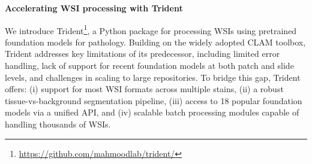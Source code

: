 \noindent\textbf{\large{Accelerating WSI processing with Trident}} \label{sec4}

We introduce Trident\footnote{\url{https://github.com/mahmoodlab/trident/}}, a Python package for processing WSIs using pretrained foundation models for pathology. Building on the widely adopted CLAM toolbox\cite{luDataefficientWeaklySupervised2021a}, Trident addresses key limitations of its predecessor, including limited error handling, lack of support for recent foundation models at both patch and slide levels, and challenges in scaling to large repositories. To bridge this gap, Trident offers: (i) support for most WSI formats across multiple stains, (ii) a robust tissue-vs-background segmentation pipeline, (iii) access to 18 popular foundation models via a unified API, and (iv) scalable batch processing modules capable of handling thousands of WSIs.



